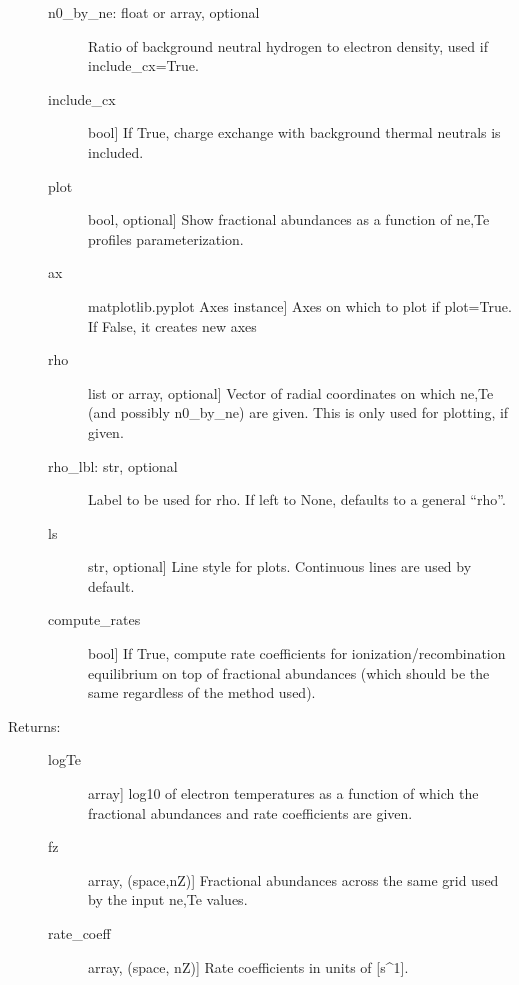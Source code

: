 \documentclass[letterpaper,10pt,english]{sphinxmanual}
\begin{document}
\begin{fulllineitems}
\begin{description}
\begin{description}
\item[{n0\_by\_ne: float or array, optional}] \leavevmode
Ratio of background neutral hydrogen to electron density, used if include\_cx=True.

\item[{include\_cx}] \leavevmode{[}bool{]}
If True, charge exchange with background thermal neutrals is included.

\item[{plot}] \leavevmode{[}bool, optional{]}
Show fractional abundances as a function of ne,Te profiles parameterization.

\item[{ax}] \leavevmode{[}matplotlib.pyplot Axes instance{]}
Axes on which to plot if plot=True. If False, it creates new axes

\item[{rho}] \leavevmode{[}list or array, optional{]}
Vector of radial coordinates on which ne,Te (and possibly n0\_by\_ne) are given. 
This is only used for plotting, if given.

\item[{rho\_lbl: str, optional}] \leavevmode
Label to be used for rho. If left to None, defaults to a general “rho”.

\item[{ls}] \leavevmode{[}str, optional{]}
Line style for plots. Continuous lines are used by default.

\item[{compute\_rates}] \leavevmode{[}bool{]}
If True, compute rate coefficients for ionization/recombination equilibrium on top
of fractional abundances (which should be the same regardless of the method used).

\end{description}

\item[{Returns:}] \leavevmode\begin{description}
\item[{logTe}] \leavevmode{[}array{]}
log10 of electron temperatures as a function of which the fractional abundances and
rate coefficients are given.

\item[{fz}] \leavevmode{[}array, (space,nZ){]}
Fractional abundances across the same grid used by the input ne,Te values.

\item[{rate\_coeff}] \leavevmode{[}array, (space, nZ){]}
Rate coefficients in units of {[}s\textasciicircum{}\sphinxhyphen{}1{]}.

\end{description}

\end{description}

\end{fulllineitems}
\end{document}
